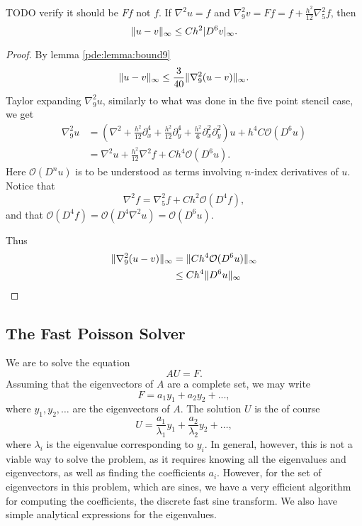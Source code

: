 \begin{theorem}
TODO verify it should be $F f$ not $f$.
If $\nabla^2 u = f$ and $\nabla_9^2 v = F f = f + \frac{h^2}{12} \nabla_5^2 f$, then
$$
\lVert u - v \rVert_\infty \leq Ch^2 \lvert D^6 v\rvert_\infty.
$$
\end{theorem}
\begin{proof}
By lemma \ref{pde:lemma:bound9}
$$
\lVert u - v \rVert_\infty \leq \frac{3}{40} \lVert \nabla_9^2 (u  - v) \rVert_\infty.
$$
Taylor expanding $\nabla_9^2 u$, similarly to what was done in the five point stencil case, we get
\begin{align*}
  \nabla_9^2 u
  &= (\nabla^2
  + \frac{h^2}{12} \partial_x^4
  + \frac{h^2}{12} \partial_y^4
  + \frac{h^2}{6} \partial_x^2 \partial_y^2
  ) u + h^4 C \mathcal{O}(D^6 u)\\
  &= \nabla^2 u + \frac{h^2}{12} \nabla^2 f + C h^4 \mathcal{O}(D^6 u).
\end{align*}
Here $\mathcal{O}(D^n u)$ is to be understood as terms involving $n$-index derivatives of $u$.
Notice that
$$
\nabla^2 f = \nabla_5^2 f + C h^2 \mathcal{O}(D^4 f),
$$
and that $\mathcal{O}(D^4 f)
= \mathcal{O}(D^4 \nabla^2 u)
= \mathcal{O}(D^6 u)$.

Thus
\begin{align}
  \lVert \nabla_9^2 (u  - v) \rVert_\infty
  &= \lVert Ch^4 \mathcal{O}(D^6u) \rVert_\infty\\
  &\leq Ch^4 \lVert D^6u \rVert_\infty
\end{align}
\end{proof}



\subsection{The Fast Poisson Solver}
We are to solve the equation
$$
A U = F.
$$
Assuming that the eigenvectors of $A$ are a complete set, we may write
$$
F = a_1 y_1 + a_2 y_2 + ...,
$$
where $y_1, y_2, \dots$ are the eigenvectors of $A$.
The solution $U$ is the of course
$$
U =
\frac{a_1}{\lambda_1} y_1
+ \frac{a_2}{\lambda_2} y_2
+ \dots,
$$
where $\lambda_i$ is the eigenvalue corresponding to $y_i$.
In general, however, this is not a viable way to solve the problem, as it requires knowing all the eigenvalues and eigenvectors, as well as finding the coefficients $a_i$.
However, for the set of eigenvectors in this problem, which are sines, we have a very efficient algorithm for computing the coefficients, the discrete fast sine transform.
We also have simple analytical expressions for the eigenvalues.

